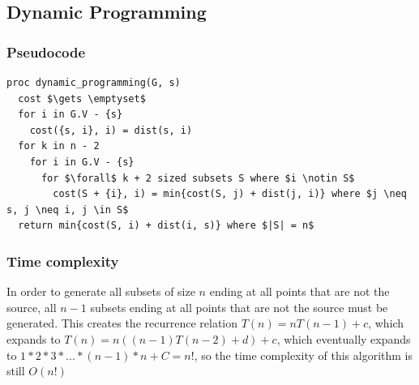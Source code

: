 \documentclass[a4paper,12pt]{article}
\begin{document}
\subsection{Dynamic Programming}
\subsubsection{Pseudocode}
\begin{lstlisting}[mathescape=true]
proc dynamic_programming(G, s)
  cost $\gets \emptyset$
  for i in G.V - {s}
    cost({s, i}, i) = dist(s, i)
  for k in n - 2
    for i in G.V - {s}
      for $\forall$ k + 2 sized subsets S where $i \notin S$
        cost(S + {i}, i) = min{cost(S, j) + dist(j, i)} where $j \neq s, j \neq i, j \in S$
  return min{cost(S, i) + dist(i, s)} where $|S| = n$    
\end{lstlisting}
\subsubsection{Time complexity}
In order to generate all subsets of size $n$ ending at all points that are not the source, all $n - 1$ subsets ending at all points that are not the source must be generated. This creates the recurrence relation $T(n) = nT(n - 1) + c$, which expands to $T(n) = n((n - 1)T(n - 2) + d) + c$, which eventually expands to $1 * 2 * 3 * ... * (n - 1) * n + C = n!$, so the time complexity of this algorithm is still $O(n!)$ 
\end{document}
